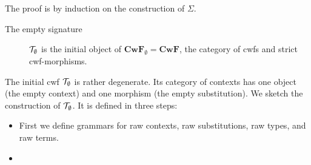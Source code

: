 \documentclass{lmcs}
\def\Cwf{\mathbf{CwF}}
\begin{document}
 The proof is by induction on the construction of $\Sigma$. 
\begin{description}
\item[The empty signature] 
${\mathcal T}_\emptyset$ is the initial object of $\Cwf_\emptyset = \Cwf$, the category of cwfs and strict cwf-morphisms.
\end{description}


The initial cwf ${\mathcal T}_\emptyset$ is rather degenerate. Its category of contexts has one object (the empty context) and one morphism (the empty substitution). 
We sketch the construction of ${\mathcal T}_\emptyset$. It is defined in three steps:
\begin{itemize}
\item 
First we define grammars for raw contexts, raw substitutions, raw types, and raw terms.
\item


\end{itemize}
\end{document}
